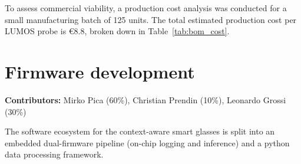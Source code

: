 \documentclass[10pt]{article}
\begin{document}
\begin{multicols}{2}
To assess commercial viability, a production cost analysis was conducted for a small manufacturing batch of 125 units. The total estimated production cost per LUMOS probe is €8.8, broken down in Table~\ref{tab:bom_cost}.

\begin{table}[H]
\centering

\label{tab:bom_cost}
\caption{Bill of Materials (BOM) and production cost breakdown per unit for a 125-unit manufacturing run of the LUMOS probe.}
\label{tab:bom_cost}
\end{table}

\section{Firmware development}
\noindent\textbf{Contributors:} Mirko Pica (60\%), Christian Prendin (10\%), Leonardo Grossi (30\%)
\vspace{0.1cm}

The software ecosystem for the context-aware smart glasses is split into an embedded dual-firmware pipeline (on-chip logging and inference) and a python data processing framework.


\end{multicols}
\end{document}

